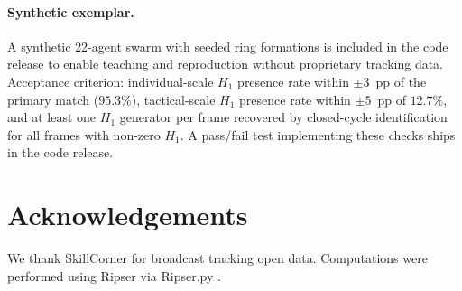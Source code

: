 \documentclass[11pt,a4paper]{article}
\begin{document}
\paragraph{Synthetic exemplar.} A synthetic 22-agent swarm with seeded ring formations is included in the code release to enable teaching and reproduction without proprietary tracking data. Acceptance criterion: individual-scale $H_1$ presence rate within $\pm 3$~pp of the primary match ($95.3\%$), tactical-scale $H_1$ presence rate within $\pm 5$~pp of $12.7\%$, and at least one $H_1$ generator per frame recovered by closed-cycle identification for all frames with non-zero $H_1$. A pass/fail test implementing these checks ships in the code release.

\section*{Acknowledgements}

We thank SkillCorner for broadcast tracking open data. Computations were performed using Ripser \citep{Bauer2021} via Ripser.py \citep{Tralie2018}.



\end{document}
